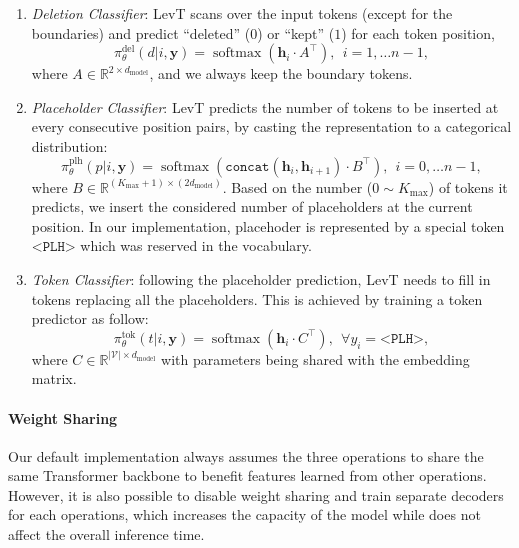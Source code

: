 \documentclass{article}
\DeclareMathOperator*{\softmax}{\text{softmax}}
\begin{document}
\begin{enumerate}[leftmargin=*]
    \item \textit{Deletion Classifier}: LevT scans over the input tokens (except for the boundaries) and predict ``deleted'' ($0$) or ``kept'' ($1$) for each token position, 
    \begin{equation}
        \pi_\theta^{\mathrm{del}}(d | i, \bm{y}) = \softmax\left(\bm{h}_i \cdot A^\top\right), \ \ i = 1, \ldots n-1,
        \label{eq.deletion_classifier}
    \end{equation}
    where $A \in \mathbb{R}^{2\times d_\text{model}}$, and we always keep the boundary tokens.
\item \textit{Placeholder Classifier}: LevT predicts the number of tokens to be inserted at every consecutive position pairs, by casting the representation to a categorical distribution:
        \begin{equation}
            \pi_\theta^{\mathrm{plh}}(p | i, \bm{y}) = \softmax\left(\texttt{concat}(\bm{h}_i, \bm{h}    _{i+1}) \cdot B^\top\right), \ \ i = 0, \ldots n-1,
            \label{eq.placeholder_classifier}
        \end{equation}
    where $B \in \mathbb{R}^{(K_{\max}+1)\times (2d_\text{model})}$. Based on the number ($0\sim K_{\max}$) of tokens it predicts, we insert the considered number of placeholders at the current position. In our implementation, placehoder is represented by a special token $\texttt{<PLH>}$ which was reserved in the vocabulary.
\item \textit{Token Classifier}: following the placeholder prediction, LevT needs to fill in tokens replacing all the placeholders. This is achieved by training a token predictor as follow:
        \begin{equation}
        \pi_\theta^{\mathrm{tok}}(t | i, \bm{y}) = \softmax\left(\bm{h}_i \cdot C^\top\right), \ \ \forall y_i = \texttt{<PLH>},
            \label{eq.token_classifier}
    \end{equation}
    where $C \in \mathbb{R}^{|\mathcal{V}|\times d_\text{model}}$ with parameters being shared with the embedding matrix.
\end{enumerate}

\paragraph{Weight Sharing} Our default implementation always assumes the three operations to share the same Transformer backbone to benefit features learned from other operations. However, it is also possible to disable weight sharing and train separate decoders for each operations, which increases the capacity of the model while does not affect the overall inference time.
\end{document}
